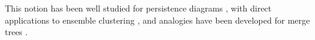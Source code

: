 This notion has
been well studied for persistence diagrams \cite{Turner2014,
lacombe2018, vidal_vis19}, with direct applications to ensemble clustering
\cite{vidal_vis19}, and analogies have been developed for merge
trees \cite{YanWMGW20, pont_vis21}.
%
%
%
%



